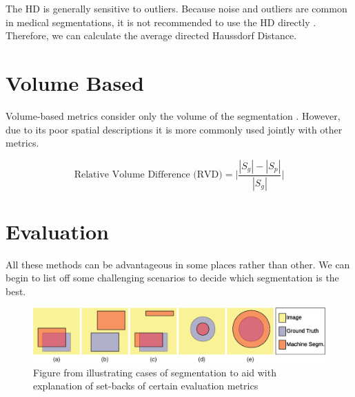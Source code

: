\documentclass[11pt,twoside]{report}
\begin{document}
The HD is generally sensitive to outliers. Because noise and outliers are common in medical segmentations, it is not recommended to use the HD directly \cite{boundary-overlap-metrics}. Therefore, we can calculate the average directed Haussdorf Distance.


\section{Volume Based}

Volume-based metrics consider only the volume of the segmentation \cite{evaluation-of-metrics-in-prostate,review-metrics, boundary-overlap-metrics}. However, due to its poor spatial descriptions it is more commonly used jointly with other metrics.

\begin{equation*}
  \text{Relative Volume Difference (RVD)} = \bigg| \frac{|S_g|-|S_p|}{|S_g|}\bigg|
\end{equation*}

\section{Evaluation}\label{sect:evaluation-of-evaluation-methods}

All these methods can be advantageous in some places rather than other. We can begin to list off some challenging scenarios to decide which segmentation is the best.

\begin{figure}[H]
  \centering
  \includegraphics[width=\linewidth]{../figures/segmentation-cases-1.png}
  \caption{Figure from \cite{boundary-overlap-metrics} illustrating cases of segmentation to aid with explanation of set-backs of certain evaluation metrics}
  \label{fig:segmentation-cases-1}
\end{figure}
\end{document}

